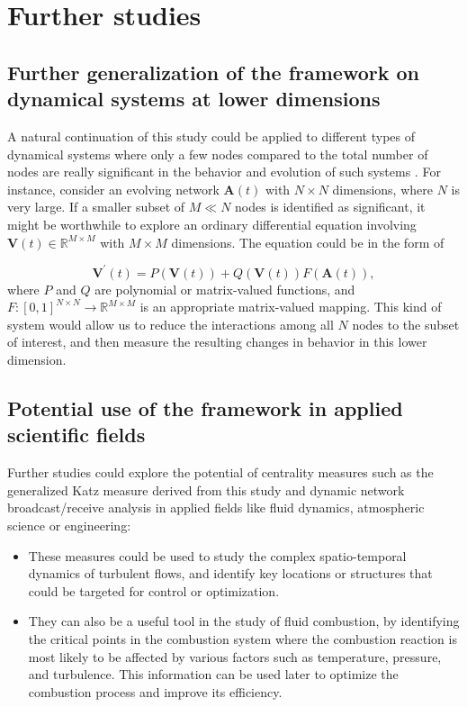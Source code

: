 
\chapter{Further studies}
\label{chap:further}
 
\section*{Further generalization of the framework on dynamical systems at lower dimensions}
A natural continuation of this study could be applied to different types of dynamical systems where only a few nodes compared to the total number of nodes are really significant in the behavior and evolution of such systems \cite{grindrod2014dynamical}. For instance, consider an evolving network $\mathbf{A}(t)$ with $N \times N$ dimensions, where $N$ is very large. If a smaller subset of $M\ll N$ nodes is identified as significant, it might be worthwhile to explore an ordinary differential equation involving $\mathbf{V}(t)\in \mathbb{R}^{M\times M}$ with $M\times M$ dimensions. The equation could be in the form of 

$$\mathbf{V}^{\prime}(t)=P(\mathbf{V}(t)) + Q(\mathbf{V}(t))F(\mathbf{A}(t)),$$ where $P$ and $Q$ are polynomial or matrix-valued functions, and $F: [0, 1]^{N\times N} \to \mathbb{R}^{M\times M}$ is an appropriate matrix-valued mapping. This kind of system would allow us to reduce the interactions among all $N$ nodes to the subset of interest, and then measure the resulting changes in behavior in this lower dimension.

\section*{Potential use of the framework in applied scientific fields} 
Further studies could explore the potential of centrality measures such as the generalized Katz measure derived from this study and dynamic network broadcast/receive analysis in applied fields like fluid dynamics, atmospheric science or engineering: 

\begin{itemize}
  \item These measures could be used to study the complex spatio-temporal dynamics of turbulent flows, and identify key locations or structures that could be targeted for control or optimization. 
  \item They can also be a useful tool in the study of fluid combustion, by identifying the critical points in the combustion system where the combustion reaction is most likely to be affected by various factors such as temperature, pressure, and turbulence. This information can be used later to optimize the combustion process and improve its efficiency.
\end{itemize}
	
